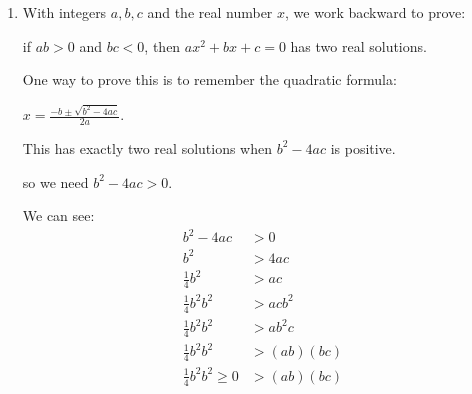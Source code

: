 \documentclass[12pt,letterpaper]{article}
\begin{document}
\begin{enumerate}
\begin{enumerate}
\begin{enumerate}
              So $3(b + c) = 3aq + ap \implies 3ar = 3aq + ap \implies 3r = 3q + p \implies 3r - 3q = p \implies 3(r - q) = p$.

              Looks like we can construct a proof if we can assume $p = 3(r - q)$.

              \begin{proof}
                Assume $a$ divides $b$ and $a$ divides $b + c$.

                These mean there exist integers $q, r$ such that $b = aq, b + c = ar$.

                Now construct another integer $p = 3(r - q)$.

                Then,
                \begin{align*}
                  3(r - q) &= p \\
                  3a(r - q) &= ap \\
                  3(ar - aq) &= ap \\
                  3(b + c - b) &= ap \\
                  3c &= ap \\
                \end{align*}

                So, we have that $a$ divides $3c$.

                Thus, if $a$ divides $b$ and $a$ divides $b + c$, then $a$ divides $3c$.
              \end{proof}
            \item
              With integers $a, b, c$ and the real number $x$,
              we work backward to prove:

              if $ab > 0$ and $bc < 0$, then $ax^2 + bx + c = 0$ has two real solutions.

              One way to prove this is to remember the quadratic formula:

              $x = \frac{-b \pm \sqrt{b^2 - 4ac}}{2a}$.

              This has exactly two real solutions when $b^2 - 4ac$ is positive.

              so we need $b^2 - 4ac > 0$.

              We can see:
              \begin{align*}
                b^2 - 4ac &> 0 \\
                b^2 &> 4ac \\
                \frac{1}{4}b^2 &> ac \\
                \frac{1}{4}b^2b^2 &> acb^2 \\
                \frac{1}{4}b^2b^2 &> ab^2c \\
                \frac{1}{4}b^2b^2 &> (ab)(bc) \\
                \frac{1}{4}b^2b^2 \geq 0 &> (ab)(bc) \\
              \end{align*}


\end{enumerate}
\end{enumerate}
\end{enumerate}
\end{document}
